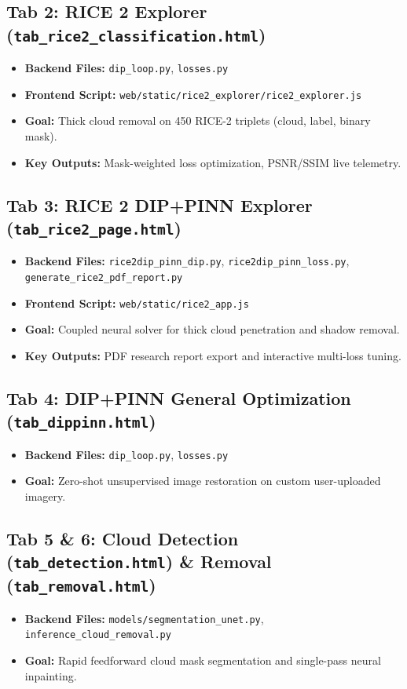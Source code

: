 \documentclass[11pt,a4paper]{article}
\begin{document}
\subsection{Tab 2: RICE 2 Explorer (\texttt{tab\_rice2\_classification.html})}
\begin{itemize}[noitemsep]
    \item \textbf{Backend Files:} \texttt{dip\_loop.py}, \texttt{losses.py}
    \item \textbf{Frontend Script:} \texttt{web/static/rice2\_explorer/rice2\_explorer.js}
    \item \textbf{Goal:} Thick cloud removal on 450 RICE-2 triplets (cloud, label, binary mask).
    \item \textbf{Key Outputs:} Mask-weighted loss optimization, PSNR/SSIM live telemetry.
\end{itemize}

\subsection{Tab 3: RICE 2 DIP+PINN Explorer (\texttt{tab\_rice2\_page.html})}
\begin{itemize}[noitemsep]
    \item \textbf{Backend Files:} \texttt{rice2dip\_pinn\_dip.py}, \texttt{rice2dip\_pinn\_loss.py}, \texttt{generate\_rice2\_pdf\_report.py}
    \item \textbf{Frontend Script:} \texttt{web/static/rice2\_app.js}
    \item \textbf{Goal:} Coupled neural solver for thick cloud penetration and shadow removal.
    \item \textbf{Key Outputs:} PDF research report export and interactive multi-loss tuning.
\end{itemize}

\subsection{Tab 4: DIP+PINN General Optimization (\texttt{tab\_dippinn.html})}
\begin{itemize}[noitemsep]
    \item \textbf{Backend Files:} \texttt{dip\_loop.py}, \texttt{losses.py}
    \item \textbf{Goal:} Zero-shot unsupervised image restoration on custom user-uploaded imagery.
\end{itemize}

\subsection{Tab 5 \& 6: Cloud Detection (\texttt{tab\_detection.html}) \& Removal (\texttt{tab\_removal.html})}
\begin{itemize}[noitemsep]
    \item \textbf{Backend Files:} \texttt{models/segmentation\_unet.py}, \texttt{inference\_cloud\_removal.py}
    \item \textbf{Goal:} Rapid feedforward cloud mask segmentation and single-pass neural inpainting.
\end{itemize}
\end{document}

